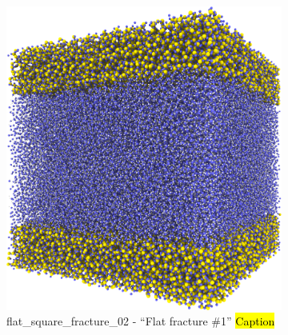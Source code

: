 %
\begin{figure}[htpb]%
    \centering%
    \setlength{\myfigwidth}{0.49\textwidth}%
%
    \begin{subfigure}[b]{\myfigwidth}%
        \centering%
        \includegraphics[width=\textwidth]{images/systems/trimmed-flat_square_fracture02_03}%
        \caption{%
            flat\_square\_fracture\_02 - ``Flat fracture \#1'' \hl{Caption} %
        }%
        \label{fig:renderings_flat_square_fracture02}%
    \end{subfigure}%
    \hfill%
    \begin{subfigure}[b]{\myfigwidth}%
        \centering%

\end{subfigure}
\end{figure}
